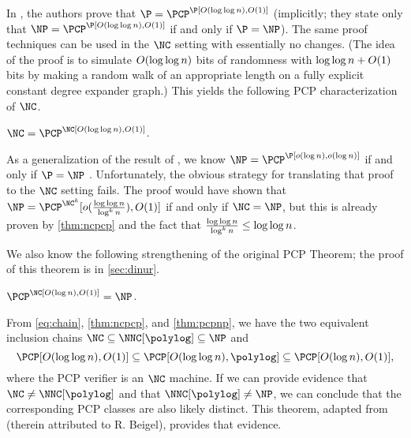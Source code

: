 In \autocite{fs96}, the authors prove that $\P = \PCP^\P[O(\loglog n), O(1)]$ (implicitly; they state only that $\NP = \PCP^\P[O(\loglog n), O(1)]$ if and only if $\P = \NP$).
The same proof techniques can be used in the $\NC$ setting with essentially no changes.
(The idea of the proof is to simulate $O(\log\log n)$ bits of randomness with $\log\log n + O(1)$ bits by making a random walk of an appropriate length on a fully explicit constant degree expander graph.)
This yields the following PCP characterization of $\NC$.

\begin{theorem}\label{thm:ncpcp}
  $\NC = \PCP^\NC[O(\loglog n), O(1)]$.
\end{theorem}

As a generalization of the result of \autocite{fs96}, we know $\NP = \PCP^\P[o(\log n), o(\log n)]$ if and only if $\P = \NP$ \autocites{as98}{fglss91}.
Unfortunately, the obvious strategy for translating that proof to the $\NC$ setting fails.
The proof would have shown that $\NP = \PCP^{\NC^k}[o(\frac{\loglog n}{\log^k n}), O(1)]$ if and only if $\NC = \NP$, but this is already proven by \autoref{thm:ncpcp} and the fact that $\frac{\log\log n}{\log^k n} \leq \log\log n$.

We also know the following strengthening of the original PCP Theorem; the proof of this theorem is in \autoref{sec:dinur}.
\begin{theorem}\label{thm:pcpnp}
  $\PCP^\NC[O(\log n), O(1)] = \NP$.
\end{theorem}

From \autoref{eq:chain}, \autoref{thm:ncpcp}, and \autoref{thm:pcpnp}, we have the two equivalent inclusion chains
$
  \NC \subseteq \NNC[\polylog] \subseteq \NP
$
and
\begin{equation*}
  \PCP[O(\loglog n), O(1)] \subseteq \PCP[O(\loglog n), \polylog] \subseteq \PCP[O(\log n), O(1)],
\end{equation*}
where the PCP verifier is an $\NC$ machine.
If we can provide evidence that $\NC \neq \NNC[\polylog]$ and that $\NNC[\polylog] \neq \NP$, we can conclude that the corresponding PCP classes are also likely distinct.
This theorem, adapted from \autocite[Theorem~1]{dt90} (therein attributed to R. Beigel), provides that evidence.

